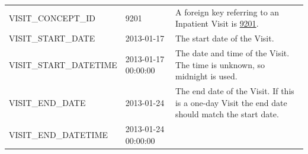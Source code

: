 \documentclass[11pt]{book}
\theoremstyle{definition}
\theoremstyle{definition}
\theoremstyle{definition}
\theoremstyle{remark}
\begin{document}
\begin{longtable}[]{@{}lll@{}}
\begin{minipage}[t]{0.28\columnwidth}
VISIT\_CONCEPT\_ID\strut
\end{minipage} & \begin{minipage}[t]{0.15\columnwidth}\raggedright
9201\strut
\end{minipage} & \begin{minipage}[t]{0.49\columnwidth}\raggedright
A foreign key referring to an Inpatient Visit is \href{http://athena.ohdsi.org/search-terms/terms/9201}{9201}.\strut
\end{minipage}\tabularnewline
\begin{minipage}[t]{0.28\columnwidth}\raggedright
VISIT\_START\_DATE\strut
\end{minipage} & \begin{minipage}[t]{0.15\columnwidth}\raggedright
2013-01-17\strut
\end{minipage} & \begin{minipage}[t]{0.49\columnwidth}\raggedright
The start date of the Visit.\strut
\end{minipage}\tabularnewline
\begin{minipage}[t]{0.28\columnwidth}\raggedright
VISIT\_START\_DATETIME\strut
\end{minipage} & \begin{minipage}[t]{0.15\columnwidth}\raggedright
2013-01-17 00:00:00\strut
\end{minipage} & \begin{minipage}[t]{0.49\columnwidth}\raggedright
The date and time of the Visit. The time is unknown, so midnight is used.\strut
\end{minipage}\tabularnewline
\begin{minipage}[t]{0.28\columnwidth}\raggedright
VISIT\_END\_DATE\strut
\end{minipage} & \begin{minipage}[t]{0.15\columnwidth}\raggedright
2013-01-24\strut
\end{minipage} & \begin{minipage}[t]{0.49\columnwidth}\raggedright
The end date of the Visit. If this is a one-day Visit the end date should match the start date.\strut
\end{minipage}\tabularnewline
\begin{minipage}[t]{0.28\columnwidth}\raggedright
VISIT\_END\_DATETIME\strut
\end{minipage} & \begin{minipage}[t]{0.15\columnwidth}\raggedright
2013-01-24 00:00:00\strut
\end{minipage} & \begin{minipage}[t]{0.49\columnwidth}\raggedright

\end{minipage}
\end{longtable}
\end{document}

